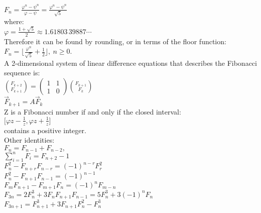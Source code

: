 \documentclass[10pt,letterpaper,twocolumn,twosided]{article}
\begin{document}
$F_n = \frac{\varphi^n-\psi^n}{\varphi-\psi} = \frac{\varphi^n-\psi^n}{\sqrt 5}$\\


where:\\


$\varphi = \frac{1 + \sqrt{5}}{2} \approx 1.61803\,39887\cdots\,$\\


Therefore it can be found by rounding, or in terms of the floor function:\\


$F_n=\bigg\lfloor\frac{\varphi^n}{\sqrt 5} + \frac{1}{2}\bigg\rfloor,\ n \geq 0.$\\


A 2-dimensional system of linear difference equations that describes the Fibonacci sequence is:\\


${F_{k+2} \choose F_{k+1}} = \begin{pmatrix} 1 & 1 \\ 1 & 0 \end{pmatrix} {F_{k+1} \choose F_{k}}$\\

$\vec F_{k+1} = A \vec F_{k}$\\


Z is a Fibonacci number if and only if the closed interval:\\


$\bigg[\varphi z-\frac{1}{z},\varphi z+\frac{1}{z}\bigg]$\\


contains a positive integer.\\


Other identities:\\


$F_{n} = F_{n-1} + F_{n-2},$\\

$\sum_{i=1}^n F_i = F_{n+2} - 1$\\

$F_n^2 - F_{n+r}F_{n-r} = (-1)^{n-r}F_r^2$\\

$F_n^2 - F_{n+1}F_{n-1} = (-1)^{n-1}$\\

$F_m F_{n+1} - F_{m+1} F_n = (-1)^n F_{m-n}$\\

$F_{3n} = 2F_n^3 + 3F_n F_{n+1} F_{n-1} = 5F_n^3 + 3 (-1)^n F_n \,$\\

$F_{3n+1} = F_{n+1}^3 + 3 F_{n+1}F_n^2 - F_n^3 \,$\\
\end{document}
